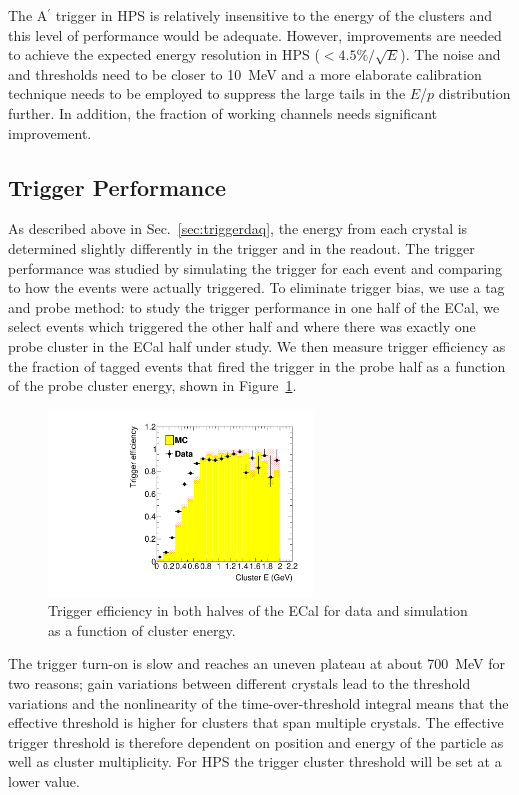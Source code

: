 \documentclass[final,3p,times,twocolumn]{elsarticle}
\newcommand{\Aprime}{A\ensuremath{^\prime}}
\begin{document}
The \Aprime{} trigger in HPS is relatively insensitive to the energy of the clusters and this level of 
performance would be adequate. However, improvements are needed to achieve the expected energy 
resolution in HPS ($<4.5\%/\sqrt{E}$). The noise and and thresholds need to be closer to 10~MeV and a 
more elaborate calibration technique needs to be employed to suppress the large tails in the $E$/$p$ 
distribution further. In addition, the fraction of working channels needs significant improvement.

\subsection{Trigger Performance}
As described above in Sec.~\ref{sec:triggerdaq}, the energy from each crystal is determined slightly 
differently in the trigger and in the readout. The trigger performance was studied by simulating the 
trigger for each event and comparing to how the events were actually triggered.
To eliminate trigger bias, we use a tag and probe method: to study the trigger performance in one half 
of the ECal, we select 
events which triggered the other half and where there was exactly one probe cluster in the ECal half 
under study. We then measure trigger efficiency as the fraction of tagged events that fired the trigger in 
the probe half as a function of the probe cluster energy, shown in Figure~\ref{fig:turnon}. 
\begin{figure}[ht]
\begin{center}
	\includegraphics[width=7cm]{h_cl_E_probedata_eff_bay_h_cl_E_probeMC_eff_bay_dataMC_1351-v7-trig-tagBot.pdf}
	\caption{\small Trigger efficiency in both halves of the ECal for data and simulation as a 
	function of cluster energy.
\label{fig:turnon}}
\end{center}
\end{figure}
The trigger turn-on is slow and reaches an uneven plateau at about 700~MeV for two reasons;  
gain variations between different crystals lead to the threshold variations and the nonlinearity of 
the time-over-threshold integral means that the effective threshold is higher for clusters that span 
multiple crystals. The effective trigger threshold is therefore dependent on position and energy of 
the particle as well as cluster multiplicity. For HPS the trigger cluster threshold will be set at a lower 
value. 
\end{document}
